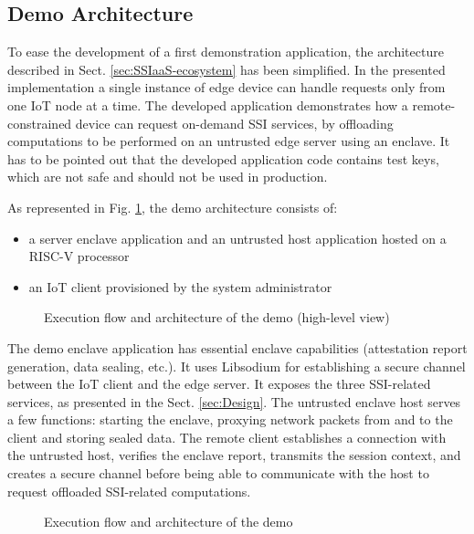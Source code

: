 \subsection{Demo Architecture}
\label{sect:demo-architecture}
To ease the development of a first demonstration application, the architecture described in Sect. \ref{sec:SSIaaS-ecosystem} has been simplified. In the presented implementation a single instance of edge device can handle requests only from one IoT node at a time. The developed application demonstrates how a remote-constrained device can request on-demand SSI services, by offloading computations to be performed on an untrusted edge server using an enclave. It has to be pointed out that the developed application code contains test keys, which are not safe and should not be used in production. 

As represented in Fig. \ref{poc-architecture-s}, the demo architecture consists of:
\begin{itemize}
    \item a server enclave application and an untrusted host application hosted on a RISC-V processor
    \item an IoT client provisioned by the system administrator  
\end{itemize} 

\begin{figure}[!h]
    \centering
    
    \caption{Execution flow and architecture of the demo (high-level view) }
    \label{poc-architecture-s}
\end{figure}

The demo enclave application has essential enclave capabilities (attestation report generation, data sealing, etc.). It uses Libsodium \cite{libsodium} for establishing a secure channel between the IoT client and the edge server. It exposes the three SSI-related services, as presented in the Sect. \ref{sec:Design}. The untrusted enclave host serves a few functions: starting the enclave, proxying network packets from and to the client and storing sealed data. The remote client establishes a connection with the untrusted host, verifies the enclave report, transmits the session context, and creates a secure channel before being able to communicate with the host to request offloaded SSI-related computations. 

\begin{figure}[!h]
    \centering
    
    \caption{Execution flow and architecture of the demo}
    \label{poc-architecture}
\end{figure}

